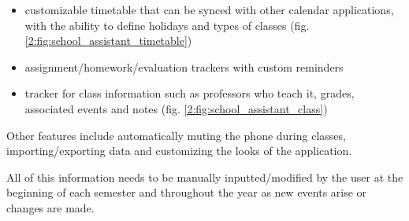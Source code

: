         \begin{itemize}
            \item customizable timetable that can be synced with other calendar applications, with the ability to define holidays and types of classes (fig. \ref{2:fig:school_assistant_timetable})
            \item assignment/homework/evaluation trackers with custom reminders
            \item tracker for class information such as professors who teach it, grades, associated events and notes (fig. \ref{2:fig:school_assistant_class})
        \end{itemize}
        
        Other features include automatically muting the phone during classes, importing/exporting data and customizing the looks of the application.
        
        All of this information needs to be manually inputted/modified by the user at the beginning of each semester and throughout the year as new events arise or changes are made.
        
        \clearpage
        
